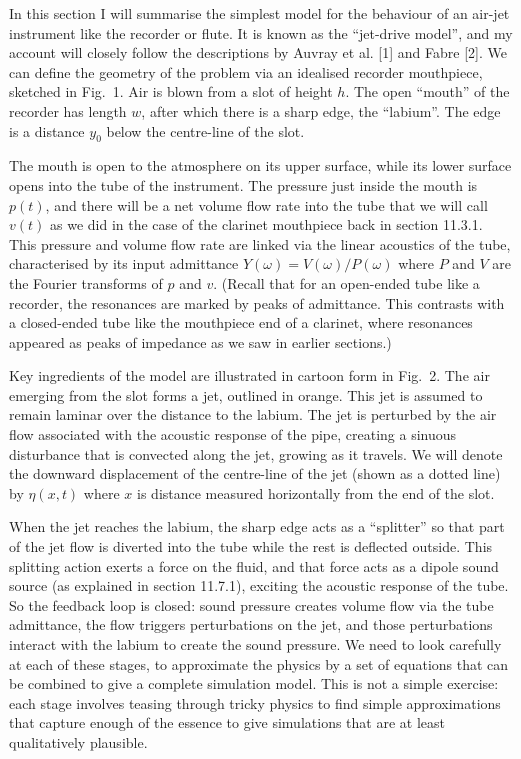   In this section I will summarise the simplest model for the behaviour of an 
  air-jet instrument like the recorder or flute. It is known as the ``jet-drive 
  model'', and my account will closely follow the descriptions by Auvray et al. 
  [1] and Fabre [2]. We can define the geometry of the problem via an idealised 
  recorder mouthpiece, sketched in Fig.\ 1. Air is blown from a slot of height 
  $h$. The open ``mouth'' of the recorder has length $w$, after which there is 
  a sharp edge, the ``labium''. The edge is a distance $y_0$ below the 
  centre-line of the slot. 

  The mouth is open to the atmosphere on its upper surface, while its lower 
  surface opens into the tube of the instrument. The pressure just inside the 
  mouth is $p(t)$, and there will be a net volume flow rate into the tube that 
  we will call $v(t)$ as we did in the case of the clarinet mouthpiece back in 
  section 11.3.1. This pressure and volume flow rate are linked via the linear 
  acoustics of the tube, characterised by its input admittance 
  $Y(\omega)=V(\omega)/P(\omega)$ where $P$ and $V$ are the Fourier transforms 
  of $p$ and $v$. (Recall that for an open-ended tube like a recorder, the 
  resonances are marked by peaks of admittance. This contrasts with a 
  closed-ended tube like the mouthpiece end of a clarinet, where resonances 
  appeared as peaks of impedance as we saw in earlier sections.) 

  Key ingredients of the model are illustrated in cartoon form in Fig.\ 2. The 
  air emerging from the slot forms a jet, outlined in orange. This jet is 
  assumed to remain laminar over the distance to the labium. The jet is 
  perturbed by the air flow associated with the acoustic response of the pipe, 
  creating a sinuous disturbance that is convected along the jet, growing as it 
  travels. We will denote the downward displacement of the centre-line of the 
  jet (shown as a dotted line) by $\eta(x,t)$ where $x$ is distance measured 
  horizontally from the end of the slot. 

  When the jet reaches the labium, the sharp edge acts as a ``splitter'' so 
  that part of the jet flow is diverted into the tube while the rest is 
  deflected outside. This splitting action exerts a force on the fluid, and 
  that force acts as a dipole sound source (as explained in section 11.7.1), 
  exciting the acoustic response of the tube. So the feedback loop is closed: 
  sound pressure creates volume flow via the tube admittance, the flow triggers 
  perturbations on the jet, and those perturbations interact with the labium to 
  create the sound pressure. We need to look carefully at each of these stages, 
  to approximate the physics by a set of equations that can be combined to give 
  a complete simulation model. This is not a simple exercise: each stage 
  involves teasing through tricky physics to find simple approximations that 
  capture enough of the essence to give simulations that are at least 
  qualitatively plausible. 

